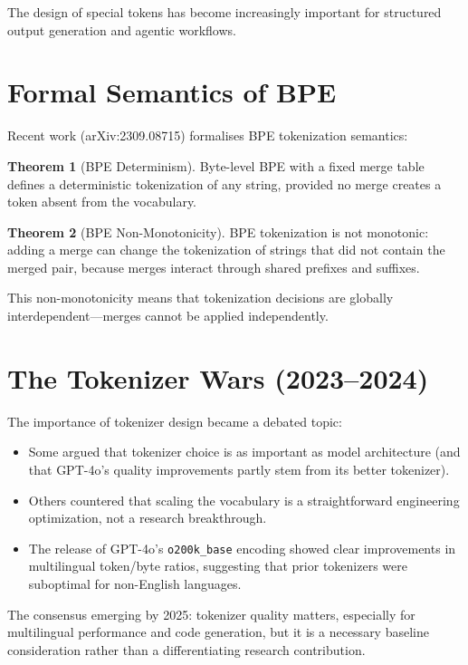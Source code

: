 \documentclass[11pt,a4paper]{book}
\theoremstyle{definition}
\newtheorem{theorem}{Theorem}[chapter]
\begin{document}
The design of special tokens has become increasingly important for structured output generation and agentic workflows.

\section{Formal Semantics of BPE}

Recent work (arXiv:2309.08715) formalises BPE tokenization semantics:

\begin{theorem}[BPE Determinism]
	Byte-level BPE with a fixed merge table defines a deterministic tokenization of any string, provided no merge creates a token absent from the vocabulary.
\end{theorem}

\begin{theorem}[BPE Non-Monotonicity]
	BPE tokenization is not monotonic: adding a merge can change the tokenization of strings that did not contain the merged pair, because merges interact through shared prefixes and suffixes.
\end{theorem}

This non-monotonicity means that tokenization decisions are globally interdependent---merges cannot be applied independently.

\section{The Tokenizer Wars (2023--2024)}

The importance of tokenizer design became a debated topic:

\begin{itemize}
	\item Some argued that tokenizer choice is as important as model architecture (and that GPT-4o's quality improvements partly stem from its better tokenizer).
	\item Others countered that scaling the vocabulary is a straightforward engineering optimization, not a research breakthrough.
	\item The release of GPT-4o's \texttt{o200k\_base} encoding showed clear improvements in multilingual token/byte ratios, suggesting that prior tokenizers were suboptimal for non-English languages.
\end{itemize}

The consensus emerging by 2025: tokenizer quality matters, especially for multilingual performance and code generation, but it is a necessary baseline consideration rather than a differentiating research contribution.
\end{document}
